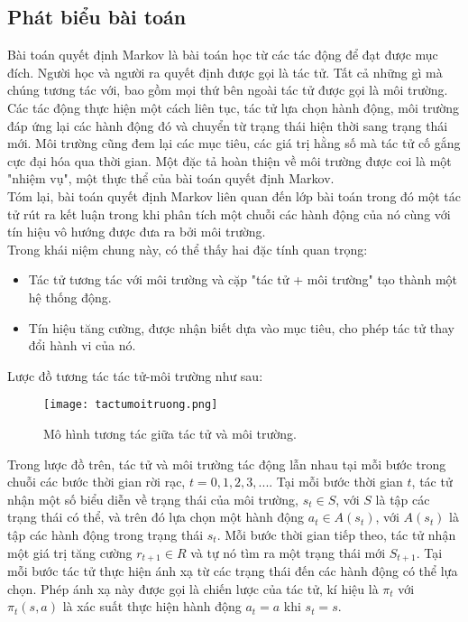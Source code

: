 \subsection{Phát biểu bài toán}
Bài toán quyết định Markov là bài toán học từ các tác động để đạt được mục đích. Người học và người ra quyết định được gọi là tác tử. Tất cả những gì mà chúng tương tác với, bao gồm mọi thứ bên ngoài tác tử được gọi là môi trường. Các tác động thực hiện một cách liên tục, tác tử lựa chọn hành động, môi trường đáp ứng lại các hành động đó và chuyển từ trạng thái hiện thời sang trạng thái mới. Môi trường cũng đem lại các mục tiêu, các giá trị hằng số mà tác tử cố gắng cực đại hóa qua thời gian. Một đặc tả hoàn thiện về môi trường được coi là một "nhiệm vụ", một thực thể của bài toán quyết định Markov.\\
Tóm lại, bài toán quyết định Markov liên quan đến lớp bài toán trong đó một tác tử rút ra kết luận trong khi phân tích một chuỗi các hành động của nó cùng với tín hiệu vô hướng được đưa ra bởi môi trường.\\
Trong khái niệm chung này, có thể thấy hai đặc tính quan trọng:
\begin{itemize}
\item Tác tử tương tác với môi trường và cặp "tác tử + môi trường" tạo thành một hệ thống động.
\item Tín hiệu tăng cường, được nhận biết dựa vào mục tiêu, cho phép tác tử thay đổi hành vi của nó.
\end{itemize}
Lược đồ tương tác tác tử-môi trường như sau:\\
\newpage
\begin{figure}[ht]
    \centering
    \texttt{[image: tactumoitruong.png]}
    \caption{Mô hình tương tác giữa tác tử và môi trường.}
    \label{fig:tactumoitruong}
\end{figure}

Trong lược đồ trên, tác tử và môi trường tác động lẫn nhau tại mỗi bước trong chuỗi các bước thời gian rời rạc, $t=0,1,2,3,...$. Tại mỗi bước thời gian $t$, tác tử nhận một số biểu diễn về trạng thái của môi trường, $s_t \in S$, với $S$ là tập các trạng thái có thể, và trên đó lựa chọn một hành động $a_t \in A(s_t)$, với $A(s_t)$ là tập các hành động trong trạng thái $s_t$. Mỗi bước thời gian tiếp theo, tác tử nhận một giá trị tăng cường $r_{t+1}\in R$ và tự nó tìm ra một trạng thái mới $S_{t+1}$.
\newline \medskip
Tại mỗi bước tác tử thực hiện ánh xạ từ các trạng thái đến các hành động có thể lựa chọn. Phép ánh xạ này được gọi là chiến lược của tác tử, kí hiệu là $\pi_t$ với $\pi_t(s,a)$ là xác suất thực hiện hành động $a_t=a$ khi $s_t=s$. 

